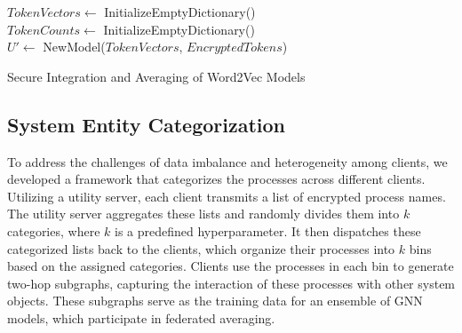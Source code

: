 \begin{algorithm}[!t]
  \scriptsize
  \DontPrintSemicolon
  \BlankLine
  $TokenVectors \leftarrow$ InitializeEmptyDictionary()\\
  $TokenCounts \leftarrow$ InitializeEmptyDictionary()\\
  $U' \leftarrow$ NewModel($TokenVectors$, $EncryptedTokens$) 
  \BlankLine
  \\
  \BlankLine
  \caption{Secure Integration and Averaging of Word2Vec Models}
  \label{alg:secure_integration_averaging_word2vec}
\end{algorithm}

\subsection{System Entity Categorization}
\label{sys:catg}
To address the challenges of data imbalance and heterogeneity among clients, we developed a framework that categorizes the processes across different clients. Utilizing a utility server, each client transmits a list of encrypted process names. The utility server aggregates these lists and randomly divides them into \(k\) categories, where \(k\) is a predefined hyperparameter. It then dispatches these categorized lists back to the clients, which organize their processes into \(k\) bins based on the assigned categories. Clients use the processes in each bin to generate two-hop subgraphs, capturing the interaction of these processes with other system objects. These subgraphs serve as the training data for an ensemble of GNN models, which participate in federated averaging.


